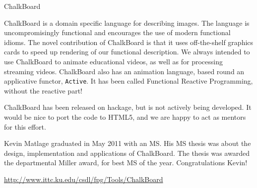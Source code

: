 \begin{hcarentry}{ChalkBoard}
\label{chalkboard}
\makeheader

ChalkBoard is a domain specific language for describing images. 
The language is uncompromisingly functional
and encourages the use of modern functional idioms.
The novel contribution of ChalkBoard is that it uses off-the-shelf
graphics cards to speed up rendering of our functional description.
We always intended to use ChalkBoard to animate educational
videos, as well as for processing streaming videos.
ChalkBoard also has an animation language,
based round an applicative functor, \verb|Active|.
It has been called Functional Reactive Programming,
without the reactive part! 

ChalkBoard has been released on hackage,
but is not actively being developed.
It would be nice to port the code to HTML5,
and we are happy to act as mentors for this effort.

Kevin Matlage graduated in May 2011 with an MS. His MS thesis was about the
design, implementation and applications of ChalkBoard. The thesis was awarded
the departmental Miller award, for best MS of the year.
Congratulations Kevin!

\FurtherReading
  \url{http://www.ittc.ku.edu/csdl/fpg/Tools/ChalkBoard}
\end{hcarentry}
